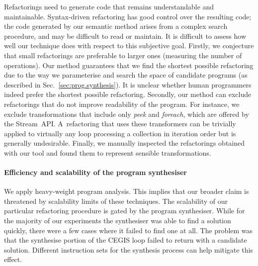 \documentclass[runningheads,a4paper]{llncs}
\begin{document}
Refactorings need to generate code that remains understandable and
maintainable.  Syntax-driven refactoring has good control over the resulting
code; the code generated by our semantic method arises from a complex search
procedure, and may be difficult to read or maintain.
%
It is difficult to assess how well our technique does with respect to this
subjective goal.  Firstly, we conjecture that small refactorings are
preferable to larger ones (measuring the number of operations).  Our method
guarantees that we find the shortest possible refactoring due to the way we
parameterise and search the space of candidate programs (as described in
Sec.~\ref{sec:prog.synthesis}). It is unclear whether human programmers
indeed prefer the shortest possible refactoring.
%
Secondly, our method can exclude refactorings that do not improve
readability of the program.  For instance, we exclude transformations that
include only \emph{peek} and \emph{foreach},
which are offered by the Stream~API.  A~refactoring that uses
these transformers can be trivially applied to virtually
any loop processing a collection in iteration order but is generally
undesirable.
%
%
Finally, we manually inspected the refactorings obtained with our tool and
found them to represent sensible transformations.

\paragraph{Efficiency and scalability of the program synthesiser}

We apply heavy-weight program analysis. This implies that our broader claim
is threatened by scalability limits of these techniques.  The scalability of
our particular refactoring procedure is gated by the program synthesiser. 
While for the majority of our experiments the synthesiser was able to find a
solution quickly, there were a few cases where it failed to find one at all. 
The problem was that the {\sc synthesise} portion of the CEGIS loop failed
to return with a candidate solution. Different instruction sets for the
synthesis process can help mitigate this effect.
\end{document}
